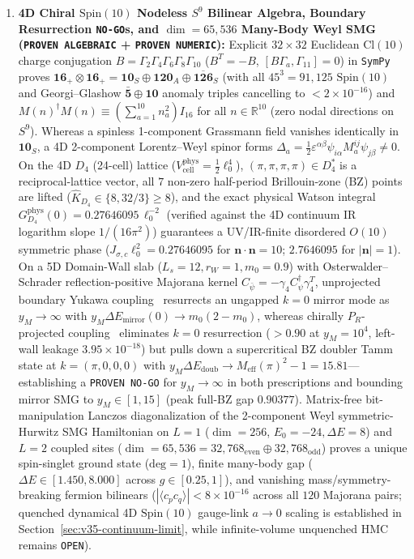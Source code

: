 \documentclass[11pt,a4paper]{article}
\begin{document}
\begin{enumerate}\setlength{\itemsep}{2pt}
\item \textbf{4D Chiral $\mathrm{Spin}(10)$ Nodeless $S^9$ Bilinear Algebra, Boundary Resurrection \texttt{NO-GO}s, and $\dim=65{,}536$ Many-Body Weyl SMG (\texttt{PROVEN ALGEBRAIC} + \texttt{PROVEN NUMERIC}):} Explicit $32\times 32$ Euclidean $\mathrm{Cl}(10)$ charge conjugation $B = \Gamma_2\Gamma_4\Gamma_6\Gamma_8\Gamma_{10}$ ($B^T=-B$, $[B\Gamma_a,\Gamma_{11}]=0$) in \texttt{SymPy} proves $\mathbf{16}_+\otimes\mathbf{16}_+ = \mathbf{10}_S\oplus\mathbf{120}_A\oplus\overline{\mathbf{126}}_S$ (with all $45^3=91{,}125$ $\mathrm{Spin}(10)$ and Georgi--Glashow $\bar{\mathbf{5}}\oplus\mathbf{10}$ anomaly triples cancelling to $<2\times 10^{-16}$) and $M(n)^\dagger M(n) \equiv (\sum_{a=1}^{10}n_a^2)I_{16}$ for all $n\in\mathbb{R}^{10}$ (zero nodal directions on $S^9$). Whereas a spinless 1-component Grassmann field vanishes identically in $\mathbf{10}_S$, a 4D 2-component Lorentz--Weyl spinor forms $\Delta_a = \frac{1}{2}\varepsilon^{\alpha\beta}\psi_{i\alpha}M_a^{ij}\psi_{j\beta}\neq 0$. On the 4D $D_4$ (24-cell) lattice ($V_{\mathrm{cell}}^{\mathrm{phys}}=\frac{1}{2}\ell_0^4$), $(\pi,\pi,\pi,\pi)\in D_4^*$ is a reciprocal-lattice vector, all $7$ non-zero half-period Brillouin-zone (BZ) points are lifted ($\hat K_{D_4}\in\{8,32/3\}\ge 8$), and the exact physical Watson integral $G_{D_4}^{\mathrm{phys}}(0)=0.27646095\,\ell_0^{-2}$ (verified against the 4D continuum IR logarithm slope $1/(16\pi^2)$) guarantees a UV/IR-finite disordered $O(10)$ symmetric phase ($J_{\sigma,c}\ell_0^2 = 0.27646095$ for $\mathbf{n}\cdot\mathbf{n}=10$; $2.7646095$ for $|\mathbf{n}|=1$). On a 5D Domain-Wall slab ($L_s=12, r_W=1, m_0=0.9$) with Osterwalder--Schrader reflection-positive Majorana kernel $C_{\bar\psi}=-\gamma_4 C_\psi^\dagger\gamma_4^T$, unprojected boundary Yukawa coupling~\cite{GoltermanPetcherRivas1992} resurrects an ungapped $k=0$ mirror mode as $y_M\to\infty$ with $y_M\Delta E_{\mathrm{mirror}}(0)\to m_0(2-m_0)$, whereas chirally $P_R$-projected coupling~\cite{WangWen2018} eliminates $k=0$ resurrection ($>0.90$ at $y_M=10^4$, left-wall leakage $3.95\times 10^{-18}$) but pulls down a supercritical BZ doubler Tamm state at $k=(\pi,0,0,0)$ with $y_M\Delta E_{\mathrm{doub}}\to M_{\mathrm{eff}}(\pi)^2-1=15.81$---establishing a \texttt{PROVEN NO-GO} for $y_M\to\infty$ in both prescriptions and bounding mirror SMG to $y_M\in[1,15]$ (peak full-BZ gap $0.90377$). Matrix-free bit-manipulation Lanczos diagonalization of the 2-component Weyl symmetric-Hurwitz SMG Hamiltonian on $L=1$ ($\dim=256$, $E_0=-24, \Delta E=8$) and $L=2$ coupled sites ($\dim=65{,}536 = 32{,}768_{\mathrm{even}}\oplus 32{,}768_{\mathrm{odd}}$) proves a unique spin-singlet ground state ($\mathrm{deg}=1$), finite many-body gap ($\Delta E\in[1.450,8.000]$ across $g\in[0.25,1]$), and vanishing mass/symmetry-breaking fermion bilinears ($|\langle c_p c_q\rangle|<8\times 10^{-16}$ across all $120$ Majorana pairs; quenched dynamical 4D $\mathrm{Spin}(10)$ gauge-link $a\to 0$ scaling is established in Section~\ref{sec:v35-continuum-limit}, while infinite-volume unquenched HMC remains \texttt{OPEN}).

\end{enumerate}
\end{document}
